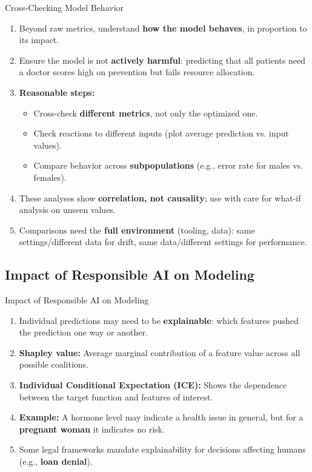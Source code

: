 \begin{frame}{Cross-Checking Model Behavior}
\begin{enumerate}
\item<1-> Beyond raw metrics, understand \textbf{how the model behaves}, in proportion to its impact.
\item<2-> Ensure the model is not \textbf{actively harmful}: predicting that all patients need a doctor scores high on prevention but fails resource allocation.
\item<3-> \textbf{Reasonable steps:}
    \begin{itemize}
    \item Cross-check \textbf{different metrics}, not only the optimized one.
    \item Check reactions to different inputs (plot average prediction vs. input values).
    \item Compare behavior across \textbf{subpopulations} (e.g., error rate for males vs. females).
    \end{itemize}
\item<4-> These analyses show \textbf{correlation, not causality}; use with care for what-if analysis on unseen values.
\item<5-> Comparisons need the \textbf{full environment} (tooling, data): same settings/different data for drift, same data/different settings for performance.
\end{enumerate}
\end{frame}

\subsection{Impact of Responsible AI on Modeling}

\begin{frame}{Impact of Responsible AI on Modeling}
\begin{enumerate}
\item<1-> Individual predictions may need to be \textbf{explainable}: which features pushed the prediction one way or another.
\item<2-> \textbf{Shapley value:} Average marginal contribution of a feature value across all possible coalitions.
\item<3-> \textbf{Individual Conditional Expectation (ICE):} Shows the dependence between the target function and features of interest.
\item<4-> \textbf{Example:} A hormone level may indicate a health issue in general, but for a \textbf{pregnant woman} it indicates no risk.
\item<5-> Some legal frameworks mandate explainability for decisions affecting humans (e.g., \textbf{loan denial}).
\end{enumerate}
\end{frame}

